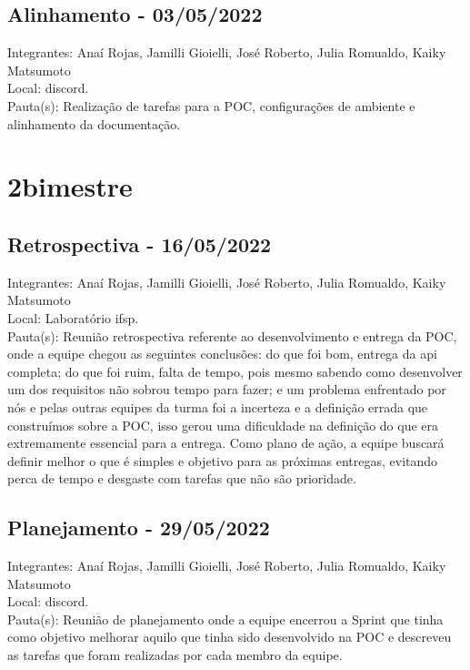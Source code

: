 \subsection{Alinhamento - 03/05/2022}
\noindent Integrantes: Anaí Rojas, Jamilli Gioielli, José Roberto, Julia Romualdo, Kaiky Matsumoto \\
Local: \gls{discord}. \\
Pauta(s): Realização de tarefas para a \acs{POC}, configurações de ambiente e alinhamento da documentação.

\section{2\textordmasculine bimestre}

\subsection{Retrospectiva - 16/05/2022}
\noindent Integrantes: Anaí Rojas, Jamilli Gioielli, José Roberto, Julia Romualdo, Kaiky Matsumoto \\
Local: Laboratório \acs{ifsp}. \\
Pauta(s): Reunião retrospectiva referente ao desenvolvimento e entrega da \acs{POC}, onde a equipe chegou as seguintes conclusões: do que foi bom, entrega da \acs{api} completa; do que foi ruim, falta de tempo, pois mesmo sabendo como desenvolver um dos requisitos não sobrou tempo para fazer; e um problema enfrentado por nós e pelas outras equipes da turma foi a incerteza e a definição errada que construímos sobre a \acs{POC}, isso gerou uma dificuldade na definição do que era extremamente essencial para a entrega. Como plano de ação, a equipe buscará definir melhor o que é simples e objetivo para as próximas entregas, evitando perca de tempo e desgaste com tarefas que não são prioridade.

\subsection{Planejamento - 29/05/2022}
\noindent Integrantes: Anaí Rojas, Jamilli Gioielli, José Roberto, Julia Romualdo, Kaiky Matsumoto \\
Local: \gls{discord}. \\
Pauta(s): Reunião de planejamento onde a equipe encerrou a \gls{Sprint} que tinha como objetivo melhorar aquilo que tinha sido desenvolvido na \acs{POC} e descreveu as tarefas que foram realizadas por cada membro da equipe.

